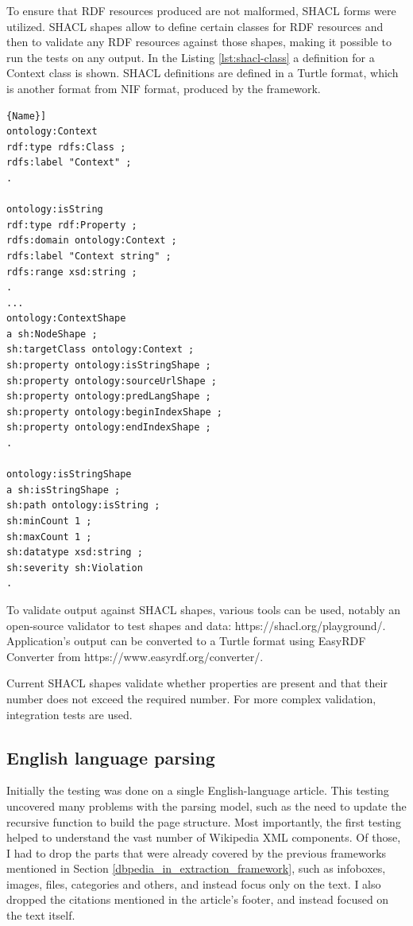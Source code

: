 \documentclass[thesis=M,english,hidelinks]{FITthesis}[2019/12/23]
\begin{document}
To ensure that \gls{RDF} resources produced are not malformed, \gls{SHACL} forms were utilized. \gls{SHACL} shapes allow to define certain classes for \gls{RDF} resources and then to validate any \gls{RDF} resources against those shapes, making it possible to run the tests on any output.
In the Listing \ref{lst:shacl-class} a definition for a Context class is shown. \gls{SHACL} definitions are defined in a Turtle format, which is another format from  \gls{NIF} format, produced by the framework.
\begin{lstlisting}[caption=SHACL Context Class definition,frame=tlrb,  label = {lst:shacl-class}]{Name}]
ontology:Context
rdf:type rdfs:Class ;
rdfs:label "Context" ;
.

ontology:isString
rdf:type rdf:Property ;
rdfs:domain ontology:Context ;
rdfs:label "Context string" ;
rdfs:range xsd:string ;
.
...
ontology:ContextShape
a sh:NodeShape ;
sh:targetClass ontology:Context ;
sh:property ontology:isStringShape ;
sh:property ontology:sourceUrlShape ;
sh:property ontology:predLangShape ;
sh:property ontology:beginIndexShape ;
sh:property ontology:endIndexShape ;
.

ontology:isStringShape
a sh:isStringShape ;
sh:path ontology:isString ;
sh:minCount 1 ;
sh:maxCount 1 ;
sh:datatype xsd:string ;
sh:severity sh:Violation
.
\end{lstlisting}

To validate output against SHACL shapes, various tools can be used, notably an open-source validator to test shapes and data: https://shacl.org/playground/. Application's output can be converted to a Turtle format using EasyRDF Converter from https://www.easyrdf.org/converter/.

Current SHACL shapes validate whether properties are present and that their number does not exceed the required number. For more complex validation, integration tests are used.

\subsection{English language parsing}

Initially the testing was done on a single English-language article. This testing uncovered many problems with the parsing model, such as the need to update the recursive function to build the page structure. Most importantly, the first testing helped to understand the vast number of Wikipedia XML components. Of those, I had to drop the parts that were already covered by the previous frameworks mentioned in Section \ref{dbpedia_in_extraction_framework}, such as infoboxes, images, files, categories and others, and instead focus only on the text. I also dropped the citations mentioned in the article's footer, and instead focused on the text itself.
\end{document}
